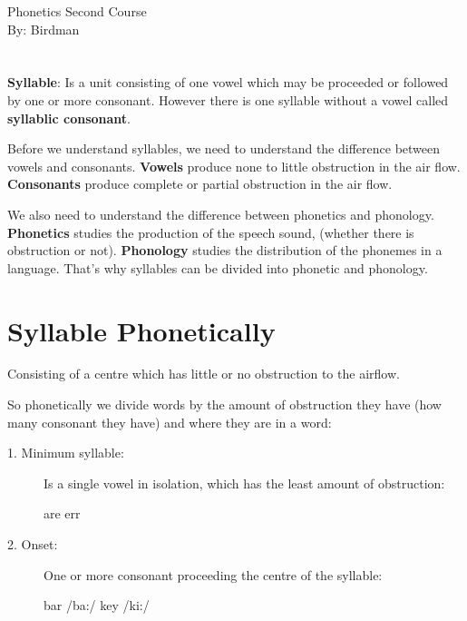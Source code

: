 \documentclass[12pt, a4paper]{article}
\begin{document}
\begin{center}
\huge{Phonetics Second Course}\\[0.5cm]
\Large{By: Birdman}\\[1cm]
\end{center}


\section*{}

{\fontpar
\textbf{Syllable}: Is a unit consisting of one vowel which may be 
proceeded or followed by one or more consonant. However there is 
one syllable without a vowel called \textbf{syllablic consonant}.\medbreak

Before we understand syllables, we need to understand the 
difference between vowels and consonants. \textbf{Vowels} produce none to 
little obstruction in the air flow. \textbf{Consonants} produce 
complete or partial obstruction in the air flow.\medbreak

We also need to understand the difference between phonetics and phonology.
\textbf{Phonetics} studies the production of the speech sound, (whether
there is obstruction or not). \textbf{Phonology} studies the distribution
of the phonemes in a language. That's why syllables can be divided into
phonetic and phonology.

\section*{Syllable Phonetically}
Consisting of a centre which has little or no obstruction to the 
airflow.\medbreak

So phonetically we divide words by the amount of obstruction they have 
(how many consonant they have) and where they are in a word:


\begin{description}
  \item[1. Minimum syllable:]Is a single vowel in isolation, which has
    the least amount of obstruction:\medbreak

    \centerline{are  \hspace{2cm} err  }

  \item[2. Onset:]One or more consonant proceeding the centre of
    the syllable:\medbreak

    \centerline{bar /ba:/ \hspace{2cm} key /ki:/}


\end{description}}
\end{document}
